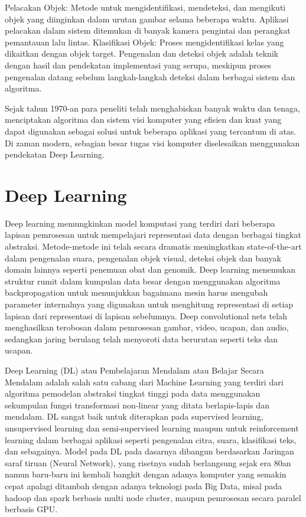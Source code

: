Pelacakan Objek: Metode untuk mengidentifikasi, mendeteksi, dan mengikuti objek yang diinginkan dalam urutan gambar selama beberapa waktu. Aplikasi pelacakan dalam sistem ditemukan di banyak kamera pengintai dan perangkat pemantauan lalu lintas.\citep{ABeginne17}
Klasifikasi Objek: Proses mengidentifikasi kelas yang dikaitkan dengan objek target. Pengenalan dan deteksi objek adalah teknik dengan hasil dan pendekatan implementasi yang serupa, meskipun proses pengenalan datang sebelum langkah-langkah deteksi dalam berbagai sistem dan algoritma.\citep{ABeginne17}

Sejak tahun 1970-an para peneliti telah menghabiskan banyak waktu dan tenaga, menciptakan algoritma dan sistem visi komputer yang efisien dan kuat yang dapat digunakan sebagai solusi untuk beberapa aplikasi yang tercantum di atas. Di zaman modern, sebagian besar tugas visi komputer diselesaikan menggunakan pendekatan Deep Learning.\citep{ABeginne17}

\section{Deep Learning}
\label{subsec:DeepLearning}
Deep learning memungkinkan model komputasi yang terdiri dari beberapa lapisan pemrosesan untuk mempelajari representasi data dengan berbagai tingkat abstraksi. Metode-metode ini telah secara dramatis meningkatkan state-of-the-art dalam pengenalan suara, pengenalan objek visual, deteksi objek dan banyak domain lainnya seperti penemuan obat dan genomik. Deep learning menemukan struktur rumit dalam kumpulan data besar dengan menggunakan algoritma backpropagation untuk menunjukkan bagaimana mesin harus mengubah parameter internalnya yang digunakan untuk menghitung representasi di setiap lapisan dari representasi di lapisan sebelumnya. Deep convolutional nets telah menghasilkan terobosan dalam pemrosesan gambar, video, ucapan, dan audio, sedangkan jaring berulang telah menyoroti data berurutan seperti teks dan ucapan.\citep{article}

Deep Learning (DL) atau Pembelajaran Mendalam atau Belajar Secara
Mendalam adalah salah satu cabang dari Machine Learning yang
terdiri dari algoritma pemodelan abstraksi tingkat tinggi pada data
menggunakan sekumpulan fungsi transformasi non-linear yang ditata
berlapis-lapis dan mendalam. DL sangat baik untuk diterapkan pada
supervised learning, unsupervised learning dan semi-supervised
learning maupun untuk reinforcement learning dalam berbagai
aplikasi seperti pengenalan citra, suara, klasifikasi teks, dan
sebagainya. Model pada DL pada dasarnya dibangun berdasarkan Jaringan
saraf tiruan (Neural Network), yang risetnya sudah berlangsung sejak
era 80an namun baru-baru ini kembali bangkit dengan adanya
komputer yang semakin cepat apalagi ditambah dengan adanya
teknologi pada Big Data, misal pada hadoop dan spark berbasis multi
node cluster, maupun pemrosesan secara paralel berbasis GPU.\citep{bookDL}

